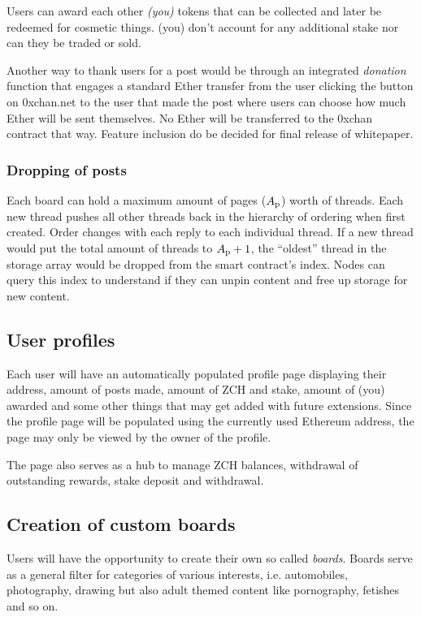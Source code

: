 \documentclass[a4paper]{article}
\newcommand{\projectname}{0xchan}
\begin{document}
Users can award each other \emph{(you)} tokens that can be collected and later be redeemed for cosmetic things. (you) don't account for any additional stake nor can they be traded or sold.

Another way to thank users for a post would be through an integrated \emph{donation} function that engages a standard Ether transfer from the user clicking the button on 0xchan.net to the user that made the post where users can choose how much Ether will be sent themselves. No Ether will be transferred to the \projectname{} contract that way. Feature inclusion do be decided for final release of whitepaper.

\subsubsection{Dropping of posts}
Each board can hold a maximum amount of pages ($A\textsubscript{p}$) worth of threads. Each new thread pushes all other threads back in the hierarchy of ordering when first created. Order changes with each reply to each individual thread. If a new thread would put the total amount of threads to $A\textsubscript{p}+1$, the ``oldest'' thread in the storage array would be dropped from the smart contract's index. Nodes can query this index to understand if they can unpin content and free up storage for new content.

\subsection{User profiles}
Each user will have an automatically populated profile page displaying their address, amount of posts made, amount of ZCH and stake, amount of (you) awarded and some other things that may get added with future extensions. Since the profile page will be populated using the currently used Ethereum address, the page may only be viewed by the owner of the profile.

The page also serves as a hub to manage ZCH balances, withdrawal of outstanding rewards, stake deposit and withdrawal.

\subsection{Creation of custom boards}
Users will have the opportunity to create their own so called \emph{boards}. Boards serve as a general filter for categories of various interests, i.e. automobiles, photography, drawing but also adult themed content like pornography, fetishes and so on.
\end{document}
